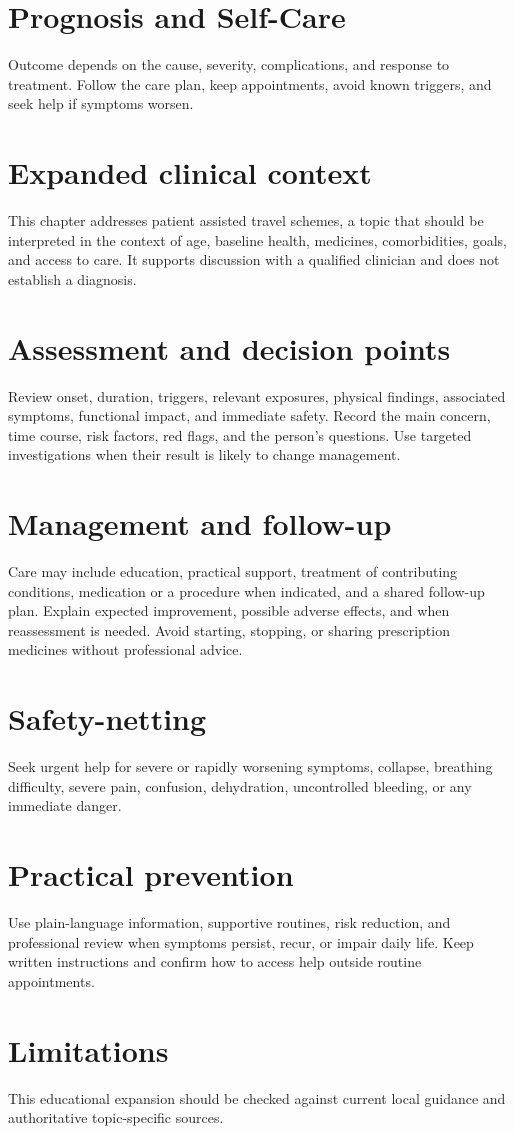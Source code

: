 \section*{Prognosis and Self-Care}
Outcome depends on the cause, severity, complications, and response to treatment. Follow the care plan, keep appointments, avoid known triggers, and seek help if symptoms worsen.

\section*{Expanded clinical context}
This chapter addresses patient assisted travel schemes, a topic that should be interpreted in the context of age, baseline health, medicines, comorbidities, goals, and access to care. It supports discussion with a qualified clinician and does not establish a diagnosis.

\section*{Assessment and decision points}
Review onset, duration, triggers, relevant exposures, physical findings, associated symptoms, functional impact, and immediate safety. Record the main concern, time course, risk factors, red flags, and the person’s questions. Use targeted investigations when their result is likely to change management.

\section*{Management and follow-up}
Care may include education, practical support, treatment of contributing conditions, medication or a procedure when indicated, and a shared follow-up plan. Explain expected improvement, possible adverse effects, and when reassessment is needed. Avoid starting, stopping, or sharing prescription medicines without professional advice.

\section*{Safety-netting}
Seek urgent help for severe or rapidly worsening symptoms, collapse, breathing difficulty, severe pain, confusion, dehydration, uncontrolled bleeding, or any immediate danger.

\section*{Practical prevention}
Use plain-language information, supportive routines, risk reduction, and professional review when symptoms persist, recur, or impair daily life. Keep written instructions and confirm how to access help outside routine appointments.

\section*{Limitations}
This educational expansion should be checked against current local guidance and authoritative topic-specific sources.
\clearpage
